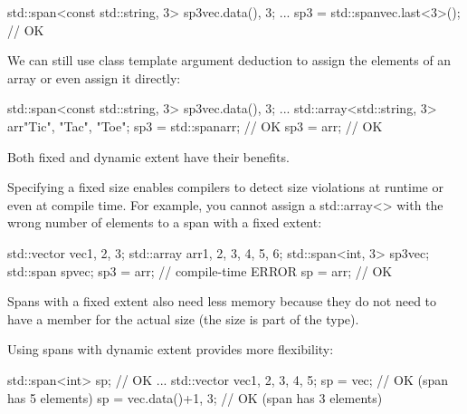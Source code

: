 \begin{cpp}
std::span<const std::string, 3> sp3{vec.data(), 3};
...
sp3 = std::span{vec}.last<3>(); // OK
\end{cpp}

We can still use class template argument deduction to assign the elements of an array or even assign it directly:

\begin{cpp}
std::span<const std::string, 3> sp3{vec.data(), 3};
...
std::array<std::string, 3> arr{"Tic", "Tac", "Toe"};
sp3 = std::span{arr}; // OK
sp3 = arr; // OK
\end{cpp}


Both fixed and dynamic extent have their benefits.

Specifying a fixed size enables compilers to detect size violations at runtime or even at compile time. For example, you cannot assign a std::array<> with the wrong number of elements to a span with a fixed extent:

\begin{cpp}
std::vector vec{1, 2, 3};
std::array arr{1, 2, 3, 4, 5, 6};
std::span<int, 3> sp3{vec};
std::span sp{vec};
sp3 = arr; // compile-time ERROR
sp = arr; // OK
\end{cpp}

Spans with a fixed extent also need less memory because they do not need to have a member for the actual size (the size is part of the type).

Using spans with dynamic extent provides more flexibility:

\begin{cpp}
std::span<int> sp; // OK
...
std::vector vec{1, 2, 3, 4, 5};
sp = vec; // OK (span has 5 elements)
sp = {vec.data()+1, 3}; // OK (span has 3 elements)
\end{cpp}








